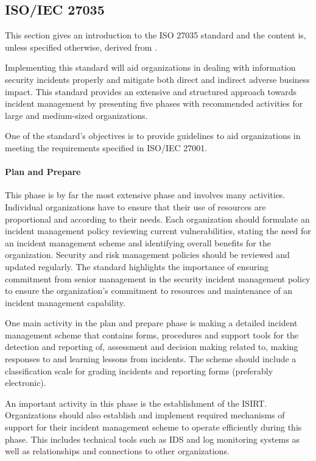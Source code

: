 \subsection{\acs{ISO}/\acs{IEC} 27035}
\label{sec:iso27035}
This section gives an introduction to the ISO 27035 standard and the content is, unless specified otherwise, derived from \cite{ISO/IEC27035}. 

Implementing this standard will aid organizations in dealing with information security incidents properly and mitigate both direct and indirect adverse business impact. This standard provides an extensive and structured approach towards incident management by presenting five phases with recommended activities for large and medium-sized organizations. 

One of the standard's objectives is to provide guidelines to aid organizations in meeting the requirements specified in ISO/IEC 27001. %

\paragraph{Plan and Prepare} This phase is by far the most extensive phase and involves many activities. Individual organizations have to ensure that their use of resources are proportional and according to their needs. Each organization should formulate an incident management policy reviewing current vulnerabilities, stating the need for an incident management scheme and identifying overall benefits for the organization. Security and risk management policies should be reviewed and updated regularly. The standard highlights the importance of ensuring commitment from senior management in the security incident management policy to ensure the organization's commitment to resources and maintenance of an incident management capability.  

One main activity in the plan and prepare phase is making a detailed incident management scheme that contains forms, procedures and support tools for the detection and reporting of, assessment and decision making related to, making responses to and learning lessons from incidents. The scheme should include a classification scale for grading incidents and reporting forms (preferably electronic).   

An important activity in this phase is the establishment of the \acf{ISIRT}. Organizations should also establish and implement required mechanisms of support for their incident management scheme to operate efficiently during this phase. This includes technical tools such as IDS and log monitoring systems as well as relationships and connections to other organizations. 


